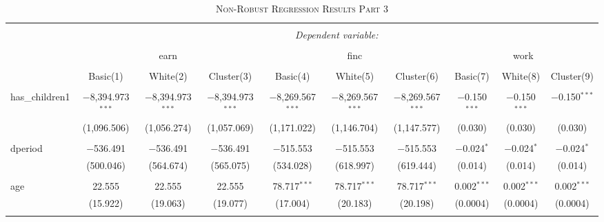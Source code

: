 \documentclass[a4paper]{article}
\begin{document}
\begin{landscape}
\begin{table}[!htbp] \centering 
\begin{adjustwidth}{1.25cm}{-0cm}
\begin{threeparttable}
\small
\captionsetup{font=small, justification=raggedright,singlelinecheck=false}
\caption{\textsc{Non-Robust Regression Results Part 3}}
\centering 
  \label{}
\small 
\begin{tabular}{@{\extracolsep{-2pt}}lccccccccc} 
\\[-5.8ex]\hline 
\hline \\[-1.8ex] 
 & \multicolumn{9}{c}{\textit{Dependent variable:}} \\ 
\cline{2-10} 
\\[-1.8ex] & \multicolumn{3}{c}{earn} & \multicolumn{3}{c}{finc} & \multicolumn{3}{c}{work} \\ 
\\[-1.8ex] & Basic(1) & White(2) & Cluster(3) & Basic(4) & White(5) & Cluster(6) & Basic(7) & White(8) & Cluster(9)\\ 
\hline \\[-1.8ex] 
 has\_children1 & $-$8,394.973$^{***}$ & $-$8,394.973$^{***}$ & $-$8,394.973$^{***}$ & $-$8,269.567$^{***}$ & $-$8,269.567$^{***}$ & $-$8,269.567$^{***}$ & $-$0.150$^{***}$ & $-$0.150$^{***}$ & $-$0.150$^{***}$ \\ 
  & (1,096.506) & (1,056.274) & (1,057.069) & (1,171.022) & (1,146.704) & (1,147.577) & (0.030) & (0.030) & (0.030) \\ 
  & & & & & & & & & \\ 
 dperiod & $-$536.491 & $-$536.491 & $-$536.491 & $-$515.553 & $-$515.553 & $-$515.553 & $-$0.024$^{*}$ & $-$0.024$^{*}$ & $-$0.024$^{*}$ \\ 
  & (500.046) & (564.674) & (565.075) & (534.028) & (618.997) & (619.444) & (0.014) & (0.014) & (0.014) \\ 
  & & & & & & & & & \\ 
 age & 22.555 & 22.555 & 22.555 & 78.717$^{***}$ & 78.717$^{***}$ & 78.717$^{***}$ & 0.002$^{***}$ & 0.002$^{***}$ & 0.002$^{***}$ \\ 
  & (15.922) & (19.063) & (19.077) & (17.004) & (20.183) & (20.198) & (0.0004) & (0.0004) & (0.0004) \\ 
  & & & & & & & & & \\ 

\end{tabular}
\end{threeparttable}
\end{adjustwidth}
\end{table}
\end{landscape}
\end{document}
